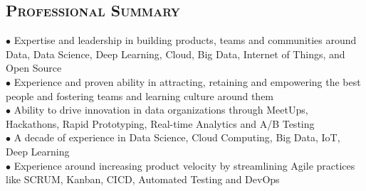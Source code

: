 \begin{resume}


\section{\textsc{Professional Summary}}
$\bullet$ Expertise and leadership in building products, teams and communities around Data, Data Science, Deep Learning, Cloud, Big Data, Internet of Things, and Open Source\\
$\bullet$ Experience and proven ability in attracting, retaining and empowering the best people and fostering teams and learning culture around them\\
$\bullet$ Ability to drive innovation in data organizations through MeetUps, Hackathons, Rapid Prototyping, Real-time Analytics and A/B Testing\\
$\bullet$ A decade of experience in Data Science, Cloud Computing, Big Data, IoT, Deep Learning\\
$\bullet$ Experience around increasing product velocity by streamlining Agile practices like SCRUM, Kanban, CICD, Automated Testing and DevOps



\end{resume}
